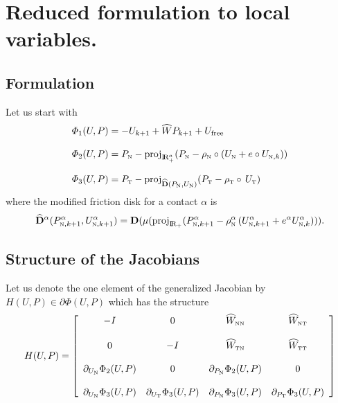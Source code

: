 
\section{Reduced formulation to local variables.}

\subsection{Formulation}

Let us start with 
\begin{equation}
  \label{eq:AC-L7}
  \begin{array}{l}
  \varPhi_1(U,P) =  - U_{k+1}  + \widehat W P_{k+1}  + U_{\mathrm{free}}\\ \\
  \varPhi_2(U,P) =  P_{{\hbox{\tiny{N}}}} - \operatorname{proj}_{\mathrm{I\!R}^{a}_+} (P_{{\hbox{\tiny{N}}}} - \rho_{{\hbox{\tiny{N}}}}\circ (U_{{\hbox{\tiny{N}}}} +e \circ  U_{{\hbox{\tiny{N}}},k}) ) \\ \\
  \varPhi_3(U,P) =  P_{{\hbox{\tiny{T}}}} - \operatorname{proj}_{\widehat {\bf D}(P_{{\hbox{\tiny{N}}}},U_{{\hbox{\tiny{N}}}})} (P_{{{\hbox{\tiny{T}}}}} - \rho_{{\hbox{\tiny{T}}}}\circ \,U_{{\hbox{\tiny{T}}}} )
\end{array}
\end{equation}
where the modified friction disk for a contact $\alpha$ is
\begin{equation}\label{eq:AC-L3}
  \widehat {\bf D}^\alpha(P^\alpha_{{\hbox{\tiny{N}}},k+1},U_{{\hbox{\tiny{N}}},k+1}^{\alpha}) = {\bf D}(\mu(\operatorname{proj}_{\mathrm{I\!R}_+} (P^\alpha_{{\hbox{\tiny{N}}},k+1} - \rho^\alpha_{{\hbox{\tiny{N}}}}\,(U_{{\hbox{\tiny{N}}},k+1}^{\alpha}+e^\alpha U_{{\hbox{\tiny{N}}},k}^{\alpha}) )).
\end{equation}
\subsection{Structure of the Jacobians}

Let us denote the one element of the  generalized Jacobian by  $ H(U,P) \in \partial \Phi(U,P)$ which has the structure
\begin{equation}
  \label{eq:AC-L6}
   H(U,P) = 
   \left[\begin{array}{cccc}
       - I & 0 &  \widehat W_{{\hbox{\tiny{N}}}{\hbox{\tiny{N}}}} & \widehat W_{{\hbox{\tiny{N}}}{\hbox{\tiny{T}}}} \\ \\
       0  & -I  &  \widehat W_{{\hbox{\tiny{T}}}{\hbox{\tiny{N}}}} & \widehat W_{{\hbox{\tiny{T}}}{\hbox{\tiny{T}}}} \\ \\
       \partial_{U_{{\hbox{\tiny{N}}}}} \Phi_2(U,P) & 0 &   \partial_{P_{{\hbox{\tiny{N}}}}} \Phi_2(U,P) & 0 \\ \\
       \partial_{U_{{\hbox{\tiny{N}}}}} \Phi_3(U,P) &  \partial_{U_{{\hbox{\tiny{T}}}}} \Phi_3(U,P) &  \partial_{P_{{\hbox{\tiny{N}}}}} \Phi_3(U,P)  & \partial_{P_{{\hbox{\tiny{T}}}}} \Phi_3(U,P)
   \end{array}\right]
\end{equation}


